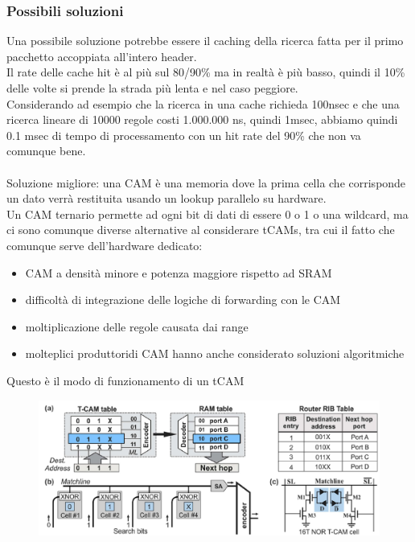 \documentclass[12pt, oneside]{extbook} %
\begin{document}
\subsubsection{Possibili soluzioni}
Una possibile soluzione potrebbe essere il caching della ricerca fatta per il primo pacchetto accoppiata all'intero header.
\\Il rate delle cache hit è al più sul 80/90\% ma in realtà è più basso, quindi il 10\% delle volte si prende la strada più lenta e nel caso peggiore.
\\ Considerando ad esempio che la ricerca in una cache richieda 100nsec e che una ricerca lineare di 10000 regole costi 1.000.000 ns, quindi 1msec, abbiamo quindi 0.1 msec di tempo di processamento con un hit rate del 90\% che non va comunque bene.\\\\
Soluzione migliore: una CAM è una memoria dove la prima cella che corrisponde un dato verrà restituita usando un lookup parallelo su hardware.
\\Un CAM ternario permette ad ogni bit di dati di essere 0 o 1 o una wildcard, ma ci sono comunque diverse alternative al considerare tCAMs, tra cui il fatto che comunque serve dell'hardware dedicato:
\begin{itemize}
    \item CAM a densità minore e potenza maggiore rispetto ad SRAM
    \item difficoltà di integrazione delle logiche di forwarding con le CAM
    \item moltiplicazione delle regole causata dai range
    \item molteplici produttoridi CAM hanno anche considerato soluzioni algoritmiche
\end{itemize}
Questo è il modo di funzionamento di un tCAM\\
\begin{figure}[h!]
    \centering
    \includegraphics[scale=0.5]{../../immagini/tcam}
\end{figure}
\end{document}

